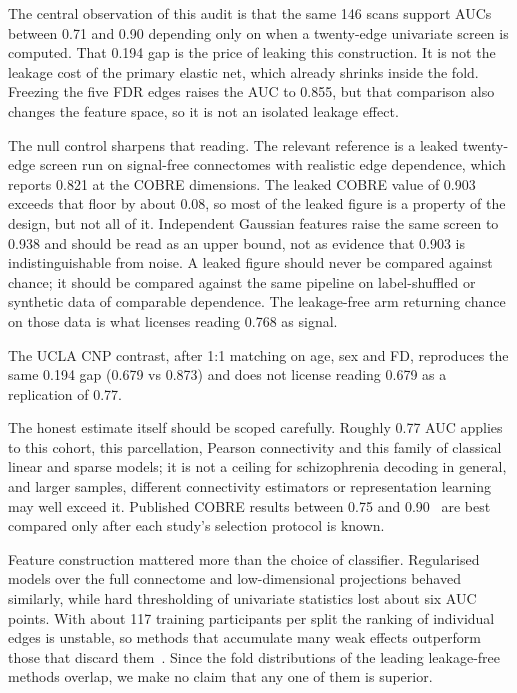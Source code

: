 \documentclass[runningheads]{llncs}
\begin{document}
The central observation of this audit is that the same 146 scans support AUCs between
0.71 and 0.90 depending only on when a twenty-edge univariate screen is computed. That
0.194 gap is the price of leaking this construction. It is not the leakage cost of the
primary elastic net, which already shrinks inside the fold. Freezing the five FDR edges
raises the AUC to 0.855, but that comparison also changes the feature space, so it is not
an isolated leakage effect.

The null control sharpens that reading. The relevant reference is a leaked twenty-edge
screen run on signal-free connectomes with realistic edge dependence, which reports 0.821
at the COBRE dimensions. The leaked COBRE value of 0.903 exceeds that floor by about
0.08, so most of the leaked figure is a property of the design, but not all of it.
Independent Gaussian features raise the same screen to 0.938 and should be read as an
upper bound, not as evidence that 0.903 is indistinguishable from noise. A leaked figure
should never be compared against chance; it should be compared against the same pipeline
on label-shuffled or synthetic data of comparable dependence. The leakage-free arm
returning chance on those data is what licenses reading 0.768 as signal.

The UCLA CNP contrast, after 1:1 matching on age, sex and FD, reproduces the same
0.194 gap (0.679 vs 0.873) and does not license reading 0.679 as a replication of 0.77.

The honest estimate itself should be scoped carefully. Roughly 0.77 AUC applies to this
cohort, this parcellation, Pearson connectivity and this family of classical linear and
sparse models; it is not a ceiling for schizophrenia decoding in general, and larger
samples, different connectivity estimators or representation learning may well exceed it.
Published COBRE results between 0.75 and 0.90~\cite{Arbabshirani2017,Wolfers2015} are best
compared only after each study's selection protocol is known.

Feature construction mattered more than the choice of classifier. Regularised models over
the full connectome and low-dimensional projections behaved similarly, while hard
thresholding of univariate statistics lost about six AUC points. With about 117
training participants per split the ranking of individual edges is unstable, so methods
that accumulate many weak effects outperform those that discard them~\cite{Varoquaux2017}.
Since the fold distributions of the leading leakage-free methods overlap, we make no claim
that any one of them is superior.
\end{document}

